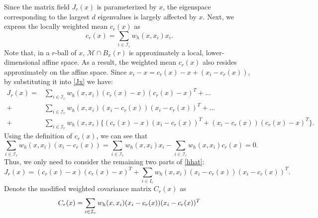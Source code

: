 \documentclass[aos,preprint]{imsart}
\theoremstyle{remark}
\begin{document}
Since the matrix field $J_r(x)$ is parameterized by $x$, the eigenspace corresponding to the largest $d$ eigenvalues is largely affected by $x$. Next, we express the locally weighted mean $c_r(x)$ as
 \begin{equation}\label{c_r_x}
 c_r(x) =  \sum_{i\in {\mathcal I}_r }w_h(x, x_i) x_i.
 \end{equation}
%
Note that, in a $r$-ball of $x$, ${\mathcal M} \cap B_x(r)$ is approximately a local, lower-dimensional affine space. As a result, the weighted mean $c_r(x)$ also resides approximately on the affine space.
Since $x_i -x = c_r(x) -x + (x_i - c_r(x))$, by substituting it into \eqref{Jx} we have:
\begin{equation}\label{hhat}
\begin{aligned}
J_r(x) =& \sum_{i\in {\mathcal I}_r} w_h(x, x_i) (c_r(x) - x)(c_r(x)-x)^T +...\\
+& \sum_{i\in {\mathcal I}_r} w_h(x, x_i) (x_i-c_r(x)) (x_i-c_r(x))^T+...\\
+&\sum_{i\in {\mathcal I}_r } w_h(x, x_i)\{(c_r(x)-x) (x_i-c_r(x))^T+ (x_i-c_r(x))(c_r(x)-x)^T\}.
\end{aligned}
\end{equation}
Using the definition of $c_r(x)$, we can see that
\[
\sum_{i\in {\mathcal I}_r} w_h(x, x_i) (x_i -c_r(x)) = \sum_{i\in {\mathcal I}_r} w_h(x, x_i) x_i -\sum_{i\in {\mathcal I}_r} w_h(x, x_i) c_r(x) = 0.
\]
Thus, we only need to consider the remaining two parts of \eqref{hhat}:
\begin{equation}\label{Hw}
J_r(x) = (c_r(x) - x)(c_r(x)-x)^T + \sum_{i\in I_r} w_h(x, x_i) (x_i-c_r(x)) (x_i-c_r(x))^T.
\end{equation}
Denote the modified weighted covariance matrix $C_r(x)$ as
\[
C_r(x) = \sum_{i\in {\cal I}_r} w_h(x, x_i) (x_i-c_r(x)) (x_i-c_r(x))^T
\]
\end{document}

